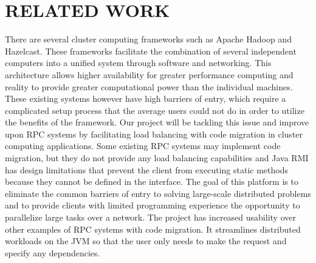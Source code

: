 \section{RELATED WORK}\label{sec:related}

There are several cluster computing frameworks such as Apache Hadoop and Hazelcast. These frameworks facilitate the combination of several independent computers into a unified system through software and networking. This architecture allows higher availability for greater performance computing and reality to provide greater computational power than the individual machines. These existing systems however have high barriers of entry, which require a complicated
setup process that the average users could not do in order to utilize the benefits of the framework. Our project will be tackling this issue and improve upon
RPC systems by facilitating load balancing with
code migration in cluster computing applications.
Some existing RPC systems may implement code
migration, but they do not provide any load balancing
capabilities and Java RMI has design limitations
that prevent the client from executing static
methods because they cannot be defined in the interface.
The goal of this platform is to eliminate
the common barriers of entry to solving large-scale
distributed problems and to provide clients with
limited programming experience the opportunity to
parallelize large tasks over a network.
The project has increased usability over other
examples of RPC systems with code migration. It
streamlines distributed workloads on the JVM so
that the user only needs to make the request and
specify any dependencies.
